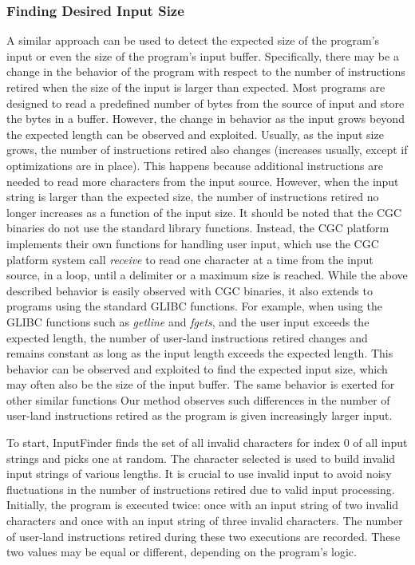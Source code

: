 \documentclass{sig-alternate-05-2015}
\def \tool {InputFinder}
\begin{document}
\subsubsection{Finding Desired Input Size}
A similar approach can be used to detect the expected size of the program's input or even the size of the program's input buffer.
Specifically, there may be a change in the behavior of the program with respect to the number of instructions retired when the size of the input is larger than expected.
Most programs are designed to read a predefined number of bytes from the source of input and store the bytes in a buffer.
However, the change in behavior as the input grows beyond the expected length can be observed and exploited. 
Usually, as the input size grows, the number of instructions retired also changes (increases usually, except if optimizations are in place).
This happens because additional instructions are needed to read more characters from the input source.
However, when the input string is larger than the expected size, the number of instructions retired no longer increases as a function of the input size.
It should be noted that the CGC binaries do not use the standard library functions.
Instead, the CGC platform implements their own functions for handling user input, which use the CGC platform system call \textit{receive} to read one character at a time from the input source, in a loop, until a delimiter or a maximum size is reached.
While the above described behavior is easily observed with CGC binaries, it also extends to programs using the standard GLIBC functions. 
For example, when using the GLIBC functions such as \textit{getline} and \textit{fgets}, and the user input exceeds the expected length, the number of user-land instructions retired changes and remains constant as long as the input length exceeds the expected length.
This behavior can be observed and exploited to find the expected input size, which may often also be the size of the input buffer.
The same behavior is exerted for other similar functions
Our method observes such differences in the number of user-land instructions retired as the program is given increasingly larger input.


To start, \tool{} finds the set of all invalid characters for index 0 of all input strings and picks one at random.
The character selected is used to build invalid input strings of various lengths.
It is crucial to use invalid input to avoid noisy fluctuations in the number of instructions retired due to valid input processing.
Initially, the program is executed twice: once with an input string of two invalid characters and once with an input string of three invalid characters.
The number of user-land instructions retired during these two executions are recorded.
These two values may be equal or different, depending on the program's logic.
\end{document}
